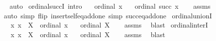 \begin{isabellebody}
\ %
\endisadelimproof
%
\isatagproof
{}\isamarkupfalse%
\ auto%
\endisatagproof
{\isafoldproof}%
%
\isadelimproof
%
\endisadelimproof
\isanewline
\isanewline
{}\isamarkupfalse%
\ ordinal{\isacharunderscore}{\kern0pt}succI\ {\isacharbrackleft}{\kern0pt}intro{\isacharbrackright}{\kern0pt}{\isacharcolon}{\kern0pt}\isanewline
\ \ \ {\isachardoublequoteopen}ordinal\ x{\isachardoublequoteclose}\isanewline
\ \ \ {\isachardoublequoteopen}ordinal\ {\isacharparenleft}{\kern0pt}succ\ x{\isacharparenright}{\kern0pt}{\isachardoublequoteclose}\isanewline
%
\isadelimproof
\ \ %
\endisadelimproof
%
\isatagproof
{}\isamarkupfalse%
\ assms\ \isamarkupfalse%
\ {\isacharparenleft}{\kern0pt}auto\ simp\ flip{\isacharcolon}{\kern0pt}\ insert{\isacharunderscore}{\kern0pt}self{\isacharunderscore}{\kern0pt}eq{\isacharunderscore}{\kern0pt}add{\isacharunderscore}{\kern0pt}one\ simp{\isacharcolon}{\kern0pt}\ succ{\isacharunderscore}{\kern0pt}eq{\isacharunderscore}{\kern0pt}add{\isacharunderscore}{\kern0pt}one{\isacharparenright}{\kern0pt}%
\endisatagproof
{\isafoldproof}%
%
\isadelimproof
\isanewline
%
\endisadelimproof
\isanewline
{}\isamarkupfalse%
\ ordinal{\isacharunderscore}{\kern0pt}unionI{\isacharcolon}{\kern0pt}\isanewline
\ \ \ {\isachardoublequoteopen}{\isasymAnd}x{\isachardot}{\kern0pt}\ x\ {\isasymin}\ X\ {\isasymLongrightarrow}\ ordinal\ x{\isachardoublequoteclose}\isanewline
\ \ \ {\isachardoublequoteopen}ordinal\ {\isacharparenleft}{\kern0pt}{\isasymUnion}X{\isacharparenright}{\kern0pt}{\isachardoublequoteclose}\isanewline
%
\isadelimproof
\ \ %
\endisadelimproof
%
\isatagproof
{}\isamarkupfalse%
\ assms\ \isamarkupfalse%
\ blast%
\endisatagproof
{\isafoldproof}%
%
\isadelimproof
\isanewline
%
\endisadelimproof
\isanewline
{}\isamarkupfalse%
\ ordinal{\isacharunderscore}{\kern0pt}interI{\isacharcolon}{\kern0pt}\isanewline
\ \ \ {\isachardoublequoteopen}{\isasymAnd}x{\isachardot}{\kern0pt}\ x\ {\isasymin}\ X\ {\isasymLongrightarrow}\ ordinal\ x{\isachardoublequoteclose}\isanewline
\ \ \ {\isachardoublequoteopen}ordinal\ {\isacharparenleft}{\kern0pt}{\isasymInter}X{\isacharparenright}{\kern0pt}{\isachardoublequoteclose}\isanewline
%
\isadelimproof
\ \ %
\endisadelimproof
%
\isatagproof
{}\isamarkupfalse%
\ assms\ \isamarkupfalse%
\ blast%
\endisatagproof
{\isafoldproof}%
%
\isadelimproof
\isanewline
%
\endisadelimproof

\end{isabellebody}
